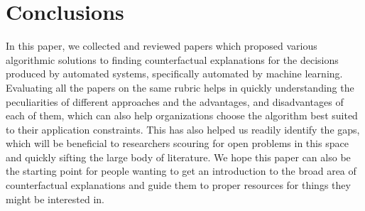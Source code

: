 \section{Conclusions}
\label{sec:conclusions}
In this paper, we collected and reviewed \papers papers which proposed various algorithmic solutions to finding counterfactual explanations for the decisions produced by automated systems, specifically automated by machine learning. 
Evaluating all the papers on the same rubric helps in quickly understanding the peculiarities of different approaches and the advantages, and disadvantages of each of them, which can also help organizations choose the algorithm best suited to their application constraints. 
This has also helped us readily identify the gaps, which will be beneficial to researchers scouring for open problems in this space and quickly sifting the large body of literature. 
We hope this paper can also be the starting point for people wanting to get an introduction to the broad area of counterfactual explanations and guide them to proper resources for things they might be interested in. \\
